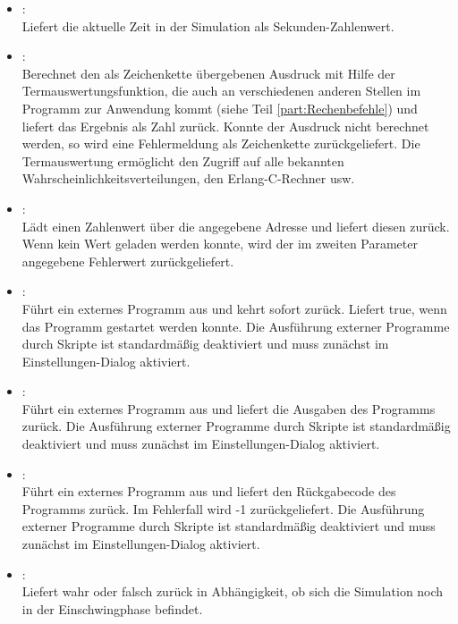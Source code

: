 \begin{itemize}

\item
{}:\\
Liefert die aktuelle Zeit in der Simulation als Sekunden-Zahlenwert.

\item
{}:\\
Berechnet den als Zeichenkette übergebenen Ausdruck mit Hilfe der Termauswertungsfunktion, die
auch an verschiedenen anderen Stellen im Programm zur Anwendung kommt (siehe Teil \ref{part:Rechenbefehle})	
und liefert das Ergebnis als Zahl zurück. Konnte der Ausdruck nicht berechnet werden, so wird eine Fehlermeldung als
Zeichenkette zurückgeliefert. Die Termauswertung ermöglicht den Zugriff auf alle bekannten
Wahrscheinlichkeitsverteilungen, den Erlang-C-Rechner usw.

\item
{}:\\
Lädt einen Zahlenwert über die angegebene Adresse und liefert diesen zurück.
Wenn kein Wert geladen werden konnte, wird der im zweiten Parameter angegebene
Fehlerwert zurückgeliefert.

\item
{}:\\
Führt ein externes Programm aus und kehrt sofort zurück. Liefert true, wenn das Programm gestartet werden konnte.
Die Ausführung externer Programme durch Skripte ist standardmäßig deaktiviert
und muss zunächst im Einstellungen-Dialog aktiviert.

\item
{}:\\
Führt ein externes Programm aus und liefert die Ausgaben des Programms zurück.
Die Ausführung externer Programme durch Skripte ist standardmäßig deaktiviert
und muss zunächst im Einstellungen-Dialog aktiviert.

\item
{}:\\
Führt ein externes Programm aus und liefert den Rückgabecode des Programms zurück.
Im Fehlerfall wird -1 zurückgeliefert.
Die Ausführung externer Programme durch Skripte ist standardmäßig deaktiviert
und muss zunächst im Einstellungen-Dialog aktiviert.

\item
{}:\\
Liefert wahr oder falsch zurück in Abhängigkeit, ob sich die Simulation noch in der Einschwingphase befindet.

\end{itemize}

